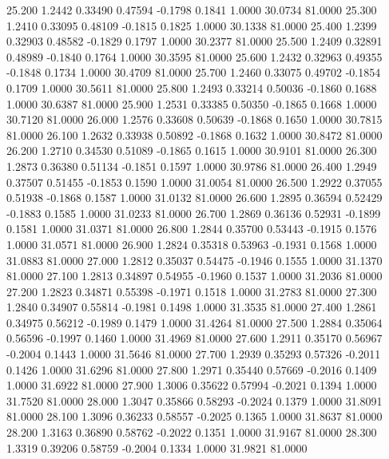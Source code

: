   25.200   1.2442   0.33490   0.47594  -0.1798   0.1841   1.0000  30.0734  81.0000
  25.300   1.2410   0.33095   0.48109  -0.1815   0.1825   1.0000  30.1338  81.0000
  25.400   1.2399   0.32903   0.48582  -0.1829   0.1797   1.0000  30.2377  81.0000
  25.500   1.2409   0.32891   0.48989  -0.1840   0.1764   1.0000  30.3595  81.0000
  25.600   1.2432   0.32963   0.49355  -0.1848   0.1734   1.0000  30.4709  81.0000
  25.700   1.2460   0.33075   0.49702  -0.1854   0.1709   1.0000  30.5611  81.0000
  25.800   1.2493   0.33214   0.50036  -0.1860   0.1688   1.0000  30.6387  81.0000
  25.900   1.2531   0.33385   0.50350  -0.1865   0.1668   1.0000  30.7120  81.0000
  26.000   1.2576   0.33608   0.50639  -0.1868   0.1650   1.0000  30.7815  81.0000
  26.100   1.2632   0.33938   0.50892  -0.1868   0.1632   1.0000  30.8472  81.0000
  26.200   1.2710   0.34530   0.51089  -0.1865   0.1615   1.0000  30.9101  81.0000
  26.300   1.2873   0.36380   0.51134  -0.1851   0.1597   1.0000  30.9786  81.0000
  26.400   1.2949   0.37507   0.51455  -0.1853   0.1590   1.0000  31.0054  81.0000
  26.500   1.2922   0.37055   0.51938  -0.1868   0.1587   1.0000  31.0132  81.0000
  26.600   1.2895   0.36594   0.52429  -0.1883   0.1585   1.0000  31.0233  81.0000
  26.700   1.2869   0.36136   0.52931  -0.1899   0.1581   1.0000  31.0371  81.0000
  26.800   1.2844   0.35700   0.53443  -0.1915   0.1576   1.0000  31.0571  81.0000
  26.900   1.2824   0.35318   0.53963  -0.1931   0.1568   1.0000  31.0883  81.0000
  27.000   1.2812   0.35037   0.54475  -0.1946   0.1555   1.0000  31.1370  81.0000
  27.100   1.2813   0.34897   0.54955  -0.1960   0.1537   1.0000  31.2036  81.0000
  27.200   1.2823   0.34871   0.55398  -0.1971   0.1518   1.0000  31.2783  81.0000
  27.300   1.2840   0.34907   0.55814  -0.1981   0.1498   1.0000  31.3535  81.0000
  27.400   1.2861   0.34975   0.56212  -0.1989   0.1479   1.0000  31.4264  81.0000
  27.500   1.2884   0.35064   0.56596  -0.1997   0.1460   1.0000  31.4969  81.0000
  27.600   1.2911   0.35170   0.56967  -0.2004   0.1443   1.0000  31.5646  81.0000
  27.700   1.2939   0.35293   0.57326  -0.2011   0.1426   1.0000  31.6296  81.0000
  27.800   1.2971   0.35440   0.57669  -0.2016   0.1409   1.0000  31.6922  81.0000
  27.900   1.3006   0.35622   0.57994  -0.2021   0.1394   1.0000  31.7520  81.0000
  28.000   1.3047   0.35866   0.58293  -0.2024   0.1379   1.0000  31.8091  81.0000
  28.100   1.3096   0.36233   0.58557  -0.2025   0.1365   1.0000  31.8637  81.0000
  28.200   1.3163   0.36890   0.58762  -0.2022   0.1351   1.0000  31.9167  81.0000
  28.300   1.3319   0.39206   0.58759  -0.2004   0.1334   1.0000  31.9821  81.0000
